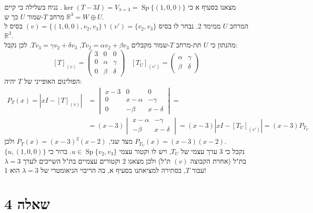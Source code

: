 \documentclass{article}
\def\reals{\mathbb{R}}
\DeclareMathOperator{\Sp}{Sp}
\begin{document}
מצאנו בסעיף א כי $\ker(T-3I)=V_{\lambda=3}=\Sp\{ (1,0,0) \}$.
נניח בשלילה כי קיים מרחב $T$-שמור $U$ כך ש $\reals^3=W\oplus U$. \\
המרחב $U$ ממימד 2. נבחר לו בסיס $(v')=\{ v_2, v_3 \}$ ו $(v)=\{ (1,0,0), v_2, v_3 \}$ בסיס ל$\reals^3$.\\
מהנתון כי $U$ תת-מרחב $T$-שמור מקבלים $Tv_2=\alpha v_2 + \beta v_3$, $Tv_3=\gamma v_2 + \delta v_3$. לכן נקבל:
\[
    [T]_{(v)}=\begin{pmatrix}
        3 & 0      & 0      \\
        0 & \alpha & \gamma \\
        0 & \beta  & \delta
    \end{pmatrix} \ \ \ \
    [T_U]_{(v')}=\begin{pmatrix}
        \alpha & \gamma \\
        \beta  & \delta
    \end{pmatrix}
\]
הפולינום האופייני של $T$ יהיה:
\begin{align*}
    P_T(x)=|xI-[T]_{(v)}| & =\begin{vmatrix}
                                 x-3 & 0        & 0        \\
                                 0   & x-\alpha & -\gamma  \\
                                 0   & -\beta   & x-\delta
                             \end{vmatrix}= \\ &=(x-3)\begin{vmatrix}
        x-\alpha & -\gamma  \\
        -\beta   & x-\delta
    \end{vmatrix}=(x-3)|xI-[T_U]_{(v')}| = (x-3)P_{T_U}
\end{align*}
מצד שני, $P_T(x)=(x-3)^2(x-2)$ ולכן $P_{T_U}(x)=(x-3)(x-2)$. \\
נקבל כי $3$ ערך עצמי של $T_U$, ויש לו וקטור עצמי $u\in \Sp\{ v_2, v_3 \}$. ברור כי $\{ u, (1,0,0) \}$ בת"ל (אחרת הקבוצה $(v)$ ת"ל) ולכן מצאנו 2 וקטורים עצמיים בת"ל השייכים לערך $\lambda=3$ עבור $T$, בסתירה למציאתנו בסעיף א, בה הריבוי הגיאומטרי של $\lambda=3$ הוא 1!

\pagebreak

\section*{שאלה 4}
\end{document}
